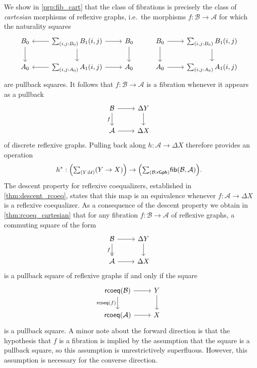 We show in \cref{prp:fib_cart} that the class of fibrations is precisely the class of \emph{cartesian} morphisms of reflexive graphs, i.e.~the morphisms $f:\mathcal{B}\to\mathcal{A}$ for which the naturality squares
\begin{equation*}
\begin{tikzcd}
\pts{B} \arrow[d] & \sm{i,j:\pts{B}}\edg{B}(i,j) \arrow[d] \arrow[r] \arrow[l] & \pts{B} \arrow[d] & \pts{B} \arrow[r] \arrow[d] & \sm{i,j:\pts{B}}\edg{B}(i,j) \arrow[d] \\
\pts{A} & \sm{i,j:\pts{A}}\edg{A}(i,j) \arrow[l] \arrow[r] & \pts{A} & \pts{A} \arrow[r] & \sm{i,j:\pts{A}}\edg{A}(i,j)
\end{tikzcd}
\end{equation*}
are pullback squares. It follows that $f:\mathcal{B}\to\mathcal{A}$ is a fibration whenever it appears as a pullback
\begin{equation*}
\begin{tikzcd}
\mathcal{B} \arrow[d,swap,"f"] \arrow[r] & \Delta Y \arrow[d] \\
\mathcal{A} \arrow[r] & \Delta X
\end{tikzcd}
\end{equation*}
of discrete reflexive graphs. Pulling back along $h:\mathcal{A}\to\Delta X$ therefore provides an operation
\begin{equation*}
h^\ast : \Big(\sm{Y:\UU}(Y\to X)\Big)\to \Big(\sm{\mathcal{B}:\mathsf{rGph}}\mathsf{fib}(\mathcal{B},\mathcal{A})\Big).
\end{equation*}
The descent property for reflexive coequalizers, established in \cref{thm:descent_rcoeq}, states that this map is an equivalence whenever $f:\mathcal{A}\to\Delta X$ is a reflexive coequalizer. As a consequence of the descent property we obtain in \cref{thm:rcoeq_cartesian} that for any fibration $f:\mathcal{B}\to\mathcal{A}$ of reflexive graphs, a commuting square of the form
\begin{equation*}
\begin{tikzcd}
\mathcal{B} \arrow[d,->>,swap,"f"] \arrow[r] & \Delta Y \arrow[d] \\
\mathcal{A} \arrow[r] & \Delta X
\end{tikzcd}
\end{equation*}
is a pullback square of reflexive graphs if and only if the square
\begin{equation*}
\begin{tikzcd}
\mathsf{rcoeq}(\mathcal{B}) \arrow[d,swap,"\mathsf{rcoeq}(f)"] \arrow[r] & Y \arrow[d] \\
\mathsf{rcoeq}(\mathcal{A}) \arrow[r] & X
\end{tikzcd}
\end{equation*}
is a pullback square. A minor note about the forward direction is that the hypothesis that $f$ is a fibration is implied by the assumption that the square is a pullback square, so this assumption is unrestrictively superfluous. However, this assumption is necessary for the converse direction.

